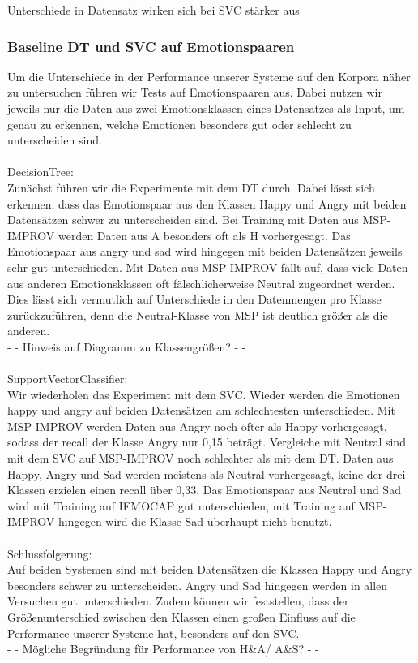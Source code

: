 \documentclass{article} %
\begin{document}
Unterschiede in Datensatz wirken sich bei SVC stärker aus

\subsubsection{Baseline DT und SVC auf Emotionspaaren}

Um die Unterschiede in der Performance unserer Systeme auf den Korpora näher zu untersuchen führen wir Tests auf Emotionspaaren aus. Dabei nutzen wir jeweils nur die Daten aus zwei Emotionsklassen eines Datensatzes als Input, um genau zu erkennen, welche Emotionen besonders gut oder schlecht zu unterscheiden sind. \\ \\
DecisionTree: \\
Zunächst führen wir die Experimente mit dem DT durch.
Dabei lässt sich erkennen, dass das Emotionspaar aus den Klassen Happy und Angry mit beiden Datensätzen schwer zu unterscheiden sind. Bei Training mit Daten aus MSP-IMPROV werden Daten aus A besonders oft als H vorhergesagt.
Das Emotionspaar aus angry und sad wird hingegen mit beiden Datensätzen jeweils sehr gut unterschieden.
Mit Daten aus MSP-IMPROV fällt auf, dass viele Daten aus anderen Emotionsklassen oft fälschlicherweise Neutral zugeordnet werden. Dies lässt sich vermutlich auf Unterschiede in den Datenmengen pro Klasse zurückzuführen, denn die Neutral-Klasse von MSP ist deutlich größer als die anderen. \\
- - Hinweis auf Diagramm zu Klassengrößen? - - \\ \\
SupportVectorClassifier: \\
Wir wiederholen das Experiment mit dem SVC.
Wieder werden die Emotionen happy und angry auf beiden Datensätzen am schlechtesten unterschieden. Mit MSP-IMPROV werden Daten aus Angry noch öfter als Happy vorhergesagt, sodass der recall der Klasse Angry nur 0,15 beträgt.
Vergleiche mit Neutral sind mit dem SVC auf MSP-IMPROV noch schlechter als mit dem DT. Daten aus Happy, Angry und Sad werden meistens als Neutral vorhergesagt, keine der drei Klassen erzielen einen recall über 0,33.
Das Emotionspaar aus Neutral und Sad wird mit Training auf IEMOCAP gut unterschieden, mit Training auf MSP-IMPROV hingegen wird die Klasse Sad überhaupt nicht benutzt. \\ \\
Schlussfolgerung: \\
Auf beiden Systemen sind mit beiden Datensätzen die Klassen Happy und Angry besonders schwer zu unterscheiden. Angry und Sad hingegen werden in allen Versuchen gut unterschieden. Zudem können wir feststellen, dass der Größenunterschied zwischen den Klassen einen großen Einfluss auf die Performance unserer Systeme hat, besonders auf den SVC. \\
- - Mögliche Begründung für Performance von H\&A/ A\&S? - - \\ \\
\end{document}
